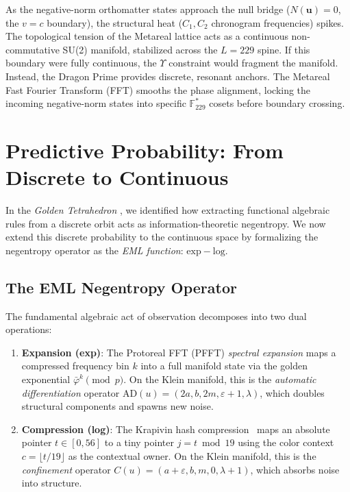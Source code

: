 As the negative-norm orthomatter states approach the null bridge ($N(\mathbf{u}) = 0$, the $v=c$ boundary), the structural heat ($C_1, C_2$ chronogram frequencies) spikes. The topological tension of the Metareal lattice acts as a continuous non-commutative SU(2) manifold, stabilized across the $L=229$ spine. If this boundary were fully continuous, the $\Upsilon$ constraint would fragment the manifold. Instead, the Dragon Prime provides discrete, resonant anchors. The Metareal Fast Fourier Transform (FFT) smooths the phase alignment, locking the incoming negative-norm states into specific $\mathbb{F}_{229}^*$ cosets before boundary crossing.

\section{Predictive Probability: From Discrete to Continuous}

In the \textit{Golden Tetrahedron} \cite{golden_tetrahedron}, we identified how extracting functional algebraic rules from a discrete orbit acts as information-theoretic negentropy. We now extend this discrete probability to the continuous space by formalizing the negentropy operator as the \emph{EML function}: $\mathrm{exp} - \mathrm{log}$.

\subsection{The EML Negentropy Operator}

The fundamental algebraic act of observation decomposes into two dual operations:

\begin{enumerate}
    \item \textbf{Expansion (exp)}: The Protoreal FFT (PFFT) \emph{spectral expansion} maps a compressed frequency bin $k$ into a full manifold state via the golden exponential $\bar\varphi^k \pmod{p}$. On the Klein manifold, this is the \emph{automatic differentiation} operator $\mathrm{AD}(u) = (2a, b, 2m, \varepsilon + 1, \lambda)$, which doubles structural components and spawns new noise.
    \item \textbf{Compression (log)}: The Krapivin hash compression~\cite{krapivin2025optimal} maps an absolute pointer $t \in [0, 56]$ to a tiny pointer $j = t \bmod 19$ using the color context $c = \lfloor t/19 \rfloor$ as the contextual owner. On the Klein manifold, this is the \emph{confinement} operator $C(u) = (a + \varepsilon, b, m, 0, \lambda + 1)$, which absorbs noise into structure.
\end{enumerate}

